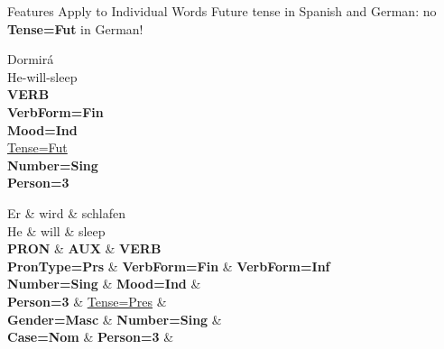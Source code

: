 \documentclass[10pt, compress, aspectratio=169]{beamer}
\newcommand{\upos}[1]{\textbf{\color{blue}#1}}
\newcommand{\feat}[1]{\textbf{\footnotesize\color{red}#1}}
\newcommand{\hlfeat}[1]{{\footnotesize\color{purple}\underline{#1}}}
\begin{document}
\begin{frame}{Features Apply to Individual Words}
Future tense in Spanish and German: no \feat{Tense=Fut} in German!

\begin{dependency}[label style={thick, font=\bfseries}]
\begin{deptext}[font=\bfseries]
Dormirá \\
He-will-sleep \\
\upos{VERB} \\
\feat{VerbForm=Fin} \\
\feat{Mood=Ind} \\
\hlfeat{Tense=Fut} \\
\feat{Number=Sing} \\
\feat{Person=3} \\
\end{deptext}
\end{dependency}
\hspace{1cm}
\begin{dependency}[label style={thick, font=\bfseries}]
\begin{deptext}[font=\bfseries]
Er \& wird \& schlafen \\
He \& will \& sleep \\
\upos{PRON} \& \upos{AUX} \& \upos{VERB} \\
\feat{PronType=Prs} \& \feat{VerbForm=Fin} \& \feat{VerbForm=Inf} \\
\feat{Number=Sing} \& \feat{Mood=Ind} \& \\
\feat{Person=3} \& \hlfeat{Tense=Pres} \& \\
\feat{Gender=Masc} \& \feat{Number=Sing} \& \\
\feat{Case=Nom} \& \feat{Person=3} \& \\
\end{deptext}
\end{dependency}
\end{frame}
\end{document}
